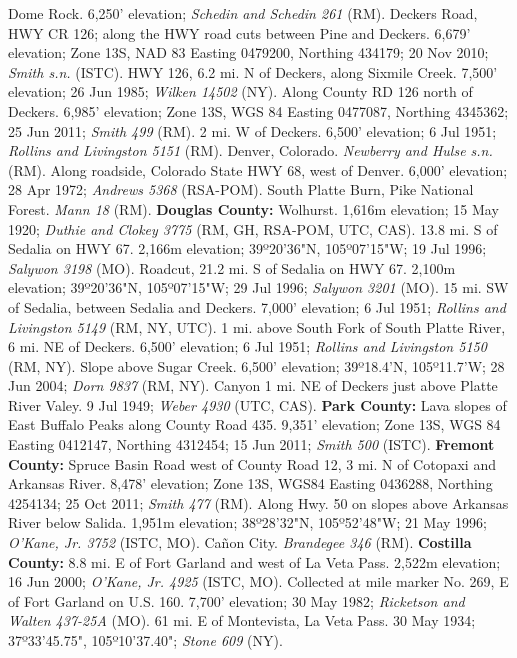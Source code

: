 Dome Rock. 6,250' elevation; \textit{Schedin and Schedin 261} (RM).
Deckers Road, HWY CR 126; along the HWY road cuts between Pine and Deckers.
6,679' elevation; Zone 13S, NAD 83 Easting 0479200, Northing 434179;
20 Nov 2010; \textit{Smith s.n.} (ISTC).
HWY 126, 6.2 mi. N of Deckers, along Sixmile Creek. 7,500' elevation;
26 Jun 1985; \textit{Wilken 14502} (NY).
Along County RD 126 north of Deckers. 6,985' elevation; Zone 13S,
WGS 84 Easting 0477087, Northing 4345362; 25 Jun 2011; \textit{Smith 499} (RM).
2 mi. W of Deckers. 6,500' elevation; 6 Jul 1951;
\textit{Rollins and Livingston 5151} (RM).
Denver, Colorado. \textit{Newberry and Hulse s.n.} (RM).
Along roadside, Colorado State HWY 68, west of Denver. 6,000' elevation;
28 Apr 1972; \textit{Andrews 5368} (RSA-POM).
South Platte Burn, Pike National Forest. \textit{Mann 18} (RM).
  \textbf{Douglas County:}
Wolhurst. 1,616m elevation; 15 May 1920;
\textit{Duthie and Clokey 3775} (RM, GH, RSA-POM, UTC, CAS).
13.8 mi. S of Sedalia on HWY 67. 2,166m elevation; 39º20'36"N, 105º07'15"W;
19 Jul 1996; \textit{Salywon 3198} (MO).
Roadcut, 21.2 mi. S of Sedalia on HWY 67. 2,100m elevation;
39º20'36"N, 105º07'15"W; 29 Jul 1996; \textit{Salywon 3201} (MO).
15 mi. SW of Sedalia, between Sedalia and Deckers. 7,000' elevation;
6 Jul 1951; \textit{Rollins and Livingston 5149} (RM, NY, UTC).
1 mi. above South Fork of South Platte River, 6 mi. NE of Deckers.
6,500' elevation; 6 Jul 1951; \textit{Rollins and Livingston 5150} (RM, NY).
Slope above Sugar Creek. 6,500' elevation; 39º18.4'N, 105º11.7'W;
28 Jun 2004; \textit{Dorn 9837} (RM, NY).
Canyon 1 mi. NE of Deckers just above Platte River Valey. 9 Jul 1949;
\textit{Weber 4930} (UTC, CAS).
  \textbf{Park County:}
Lava slopes of East Buffalo Peaks along County Road 435. 9,351' elevation;
Zone 13S, WGS 84 Easting 0412147, Northing 4312454; 15 Jun 2011;
\textit{Smith 500} (ISTC).
  \textbf{Fremont County:}
Spruce Basin Road west of County Road 12, 3 mi. N of Cotopaxi and Arkansas
River. 8,478' elevation; Zone 13S, WGS84 Easting 0436288, Northing 4254134;
25 Oct 2011; \textit{Smith 477} (RM).
Along Hwy. 50 on slopes above Arkansas River below Salida. 1,951m elevation;
38º28'32"N, 105º52'48"W; 21 May 1996; \textit{O'Kane, Jr. 3752} (ISTC, MO).
Cañon City. \textit{Brandegee 346} (RM).
  \textbf{Costilla County:}
8.8 mi. E of Fort Garland and west of La Veta Pass. 2,522m elevation;
16 Jun 2000; \textit{O'Kane, Jr. 4925} (ISTC, MO).
Collected at mile marker No. 269, E of Fort Garland on U.S. 160.
7,700' elevation; 30 May 1982; \textit{Ricketson and Walten 437-25A} (MO).
61 mi. E of Montevista, La Veta Pass. 30 May 1934;
37º33'45.75", 105º10'37.40"; \textit{Stone 609} (NY).


